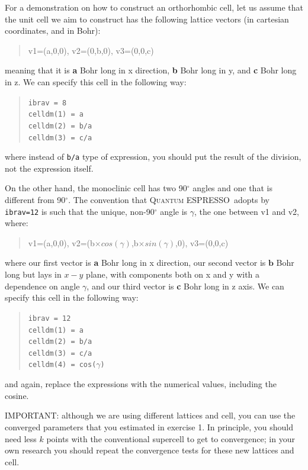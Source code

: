 \documentclass[12pt]{article}
\def\QE{\textsc{Quantum ESPRESSO}\xspace}
\begin{document}
For a demonstration on how to construct an orthorhombic cell, let us assume that the unit
cell we aim to construct has the following lattice vectors (in cartesian coordinates,
and in Bohr):
%
\begin{quotation}
v1=(a,0,0), v2=(0,b,0), v3=(0,0,c)
\end{quotation}
%
meaning that it is \textbf{a} Bohr long in x direction, \textbf{b} Bohr long in y,
and \textbf{c} Bohr long in z.
We can specify this cell in the following way:
%
\begin{quotation}
{\tt ibrav = 8 \\
celldm(1) = a \\
celldm(2) = b/a \\
celldm(3) = c/a}
\end{quotation}
%
where instead of {\tt b/a} type of expression, you should put the result of the division,
not the expression itself.

On the other hand, the monoclinic cell has two 90$^\circ$ angles and one that is
different from 90$^\circ$. The convention that \QE\, adopts by {\tt ibrav=12} is
such that the unique, non-90$^\circ$ angle is $\gamma$, the one between v1 and v2,
where:
% 
\begin{quotation}
v1=(a,0,0), v2=(b$\times cos(\gamma)$,b$\times sin(\gamma)$,0), v3=(0,0,c)
\end{quotation}
%
where our first vector is \textbf{a} Bohr long in x direction, our second vector is
$\mathbf{b}$ Bohr long but lays in $x-y$ plane, with components both on x and y with
a dependence on angle $\gamma$, and our third vector is \textbf{c} Bohr long in z axis.
We can specify this cell in the following way:
\begin{quotation}
    {\tt ibrav = 12} \\
    {\tt celldm(1) = a }\\
    {\tt celldm(2) = b/a }\\
    {\tt celldm(3) = c/a } \\
    {\tt celldm(4) = cos($\gamma$) }
\end{quotation}
%
and again, replace the expressions with the numerical values, including the cosine.

IMPORTANT: although we are using different lattices and cell, you can use the converged
parameters that you estimated in exercise 1.
In principle, you should need less $k$ points with the conventional supercell to get to
convergence; in your own research you should repeat the convergence tests for these new
lattices and cell.
\end{document}
